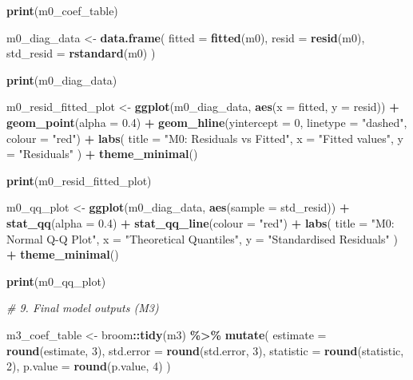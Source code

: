 \documentclass[
]{article}
\newenvironment{Shaded}{\begin{snugshade}}{\end{snugshade}}
\newcommand{\AttributeTok}[1]{\textcolor[rgb]{0.13,0.29,0.53}{#1}}
\newcommand{\CommentTok}[1]{\textcolor[rgb]{0.56,0.35,0.01}{\textit{#1}}}
\newcommand{\DecValTok}[1]{\textcolor[rgb]{0.00,0.00,0.81}{#1}}
\newcommand{\FloatTok}[1]{\textcolor[rgb]{0.00,0.00,0.81}{#1}}
\newcommand{\FunctionTok}[1]{\textcolor[rgb]{0.13,0.29,0.53}{\textbf{#1}}}
\newcommand{\NormalTok}[1]{#1}
\newcommand{\OtherTok}[1]{\textcolor[rgb]{0.56,0.35,0.01}{#1}}
\newcommand{\SpecialCharTok}[1]{\textcolor[rgb]{0.81,0.36,0.00}{\textbf{#1}}}
\newcommand{\StringTok}[1]{\textcolor[rgb]{0.31,0.60,0.02}{#1}}
\begin{document}
\begin{Shaded}
\begin{Highlighting}[]
\FunctionTok{print}\NormalTok{(m0\_coef\_table)}

\NormalTok{m0\_diag\_data }\OtherTok{\textless{}{-}} \FunctionTok{data.frame}\NormalTok{(}
  \AttributeTok{fitted =} \FunctionTok{fitted}\NormalTok{(m0),}
  \AttributeTok{resid =} \FunctionTok{resid}\NormalTok{(m0),}
  \AttributeTok{std\_resid =} \FunctionTok{rstandard}\NormalTok{(m0)}
\NormalTok{)}

\FunctionTok{print}\NormalTok{(m0\_diag\_data)}

\NormalTok{m0\_resid\_fitted\_plot }\OtherTok{\textless{}{-}} \FunctionTok{ggplot}\NormalTok{(m0\_diag\_data, }\FunctionTok{aes}\NormalTok{(}\AttributeTok{x =}\NormalTok{ fitted, }\AttributeTok{y =}\NormalTok{ resid)) }\SpecialCharTok{+}
  \FunctionTok{geom\_point}\NormalTok{(}\AttributeTok{alpha =} \FloatTok{0.4}\NormalTok{) }\SpecialCharTok{+}
  \FunctionTok{geom\_hline}\NormalTok{(}\AttributeTok{yintercept =} \DecValTok{0}\NormalTok{, }\AttributeTok{linetype =} \StringTok{"dashed"}\NormalTok{, }\AttributeTok{colour =} \StringTok{"red"}\NormalTok{) }\SpecialCharTok{+}
  \FunctionTok{labs}\NormalTok{(}
    \AttributeTok{title =} \StringTok{"M0: Residuals vs Fitted"}\NormalTok{,}
    \AttributeTok{x =} \StringTok{"Fitted values"}\NormalTok{,}
    \AttributeTok{y =} \StringTok{"Residuals"}
\NormalTok{  ) }\SpecialCharTok{+}
  \FunctionTok{theme\_minimal}\NormalTok{()}

\FunctionTok{print}\NormalTok{(m0\_resid\_fitted\_plot)}

\NormalTok{m0\_qq\_plot }\OtherTok{\textless{}{-}} \FunctionTok{ggplot}\NormalTok{(m0\_diag\_data, }\FunctionTok{aes}\NormalTok{(}\AttributeTok{sample =}\NormalTok{ std\_resid)) }\SpecialCharTok{+}
  \FunctionTok{stat\_qq}\NormalTok{(}\AttributeTok{alpha =} \FloatTok{0.4}\NormalTok{) }\SpecialCharTok{+}
  \FunctionTok{stat\_qq\_line}\NormalTok{(}\AttributeTok{colour =} \StringTok{"red"}\NormalTok{) }\SpecialCharTok{+}
  \FunctionTok{labs}\NormalTok{(}
    \AttributeTok{title =} \StringTok{"M0: Normal Q{-}Q Plot"}\NormalTok{,}
    \AttributeTok{x =} \StringTok{"Theoretical Quantiles"}\NormalTok{,}
    \AttributeTok{y =} \StringTok{"Standardised Residuals"}
\NormalTok{  ) }\SpecialCharTok{+}
  \FunctionTok{theme\_minimal}\NormalTok{()}

\FunctionTok{print}\NormalTok{(m0\_qq\_plot)}

\CommentTok{\# 9. Final model outputs (M3)}

\NormalTok{m3\_coef\_table }\OtherTok{\textless{}{-}}\NormalTok{ broom}\SpecialCharTok{::}\FunctionTok{tidy}\NormalTok{(m3) }\SpecialCharTok{\%\textgreater{}\%}
  \FunctionTok{mutate}\NormalTok{(}
    \AttributeTok{estimate =} \FunctionTok{round}\NormalTok{(estimate, }\DecValTok{3}\NormalTok{),}
    \AttributeTok{std.error =} \FunctionTok{round}\NormalTok{(std.error, }\DecValTok{3}\NormalTok{),}
    \AttributeTok{statistic =} \FunctionTok{round}\NormalTok{(statistic, }\DecValTok{2}\NormalTok{),}
    \AttributeTok{p.value =} \FunctionTok{round}\NormalTok{(p.value, }\DecValTok{4}\NormalTok{)}
\NormalTok{  )}


\end{Highlighting}
\end{Shaded}
\end{document}
